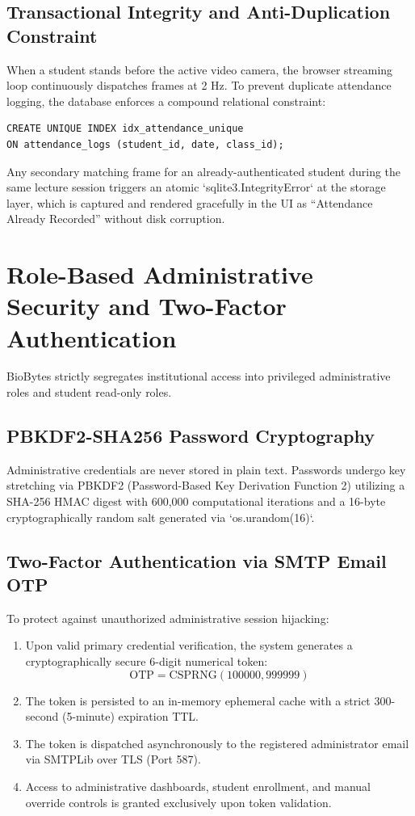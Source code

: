 \subsection{Transactional Integrity and Anti-Duplication Constraint}
When a student stands before the active video camera, the browser streaming loop continuously dispatches frames at 2 Hz. To prevent duplicate attendance logging, the database enforces a compound relational constraint:
\begin{verbatim}
CREATE UNIQUE INDEX idx_attendance_unique 
ON attendance_logs (student_id, date, class_id);
\end{verbatim}
Any secondary matching frame for an already-authenticated student during the same lecture session triggers an atomic `sqlite3.IntegrityError` at the storage layer, which is captured and rendered gracefully in the UI as ``Attendance Already Recorded'' without disk corruption.

\section{Role-Based Administrative Security and Two-Factor Authentication}
BioBytes strictly segregates institutional access into privileged administrative roles and student read-only roles.

\subsection{PBKDF2-SHA256 Password Cryptography}
Administrative credentials are never stored in plain text. Passwords undergo key stretching via PBKDF2 (Password-Based Key Derivation Function 2) utilizing a SHA-256 HMAC digest with 600,000 computational iterations and a 16-byte cryptographically random salt generated via `os.urandom(16)`.

\subsection{Two-Factor Authentication via SMTP Email OTP}
To protect against unauthorized administrative session hijacking:
\begin{enumerate}
    \item Upon valid primary credential verification, the system generates a cryptographically secure 6-digit numerical token:
    \begin{equation}
    \text{OTP} = \text{CSPRNG}(100000, 999999)
    \end{equation}
    \item The token is persisted to an in-memory ephemeral cache with a strict 300-second (5-minute) expiration TTL.
    \item The token is dispatched asynchronously to the registered administrator email via SMTPLib over TLS (Port 587).
    \item Access to administrative dashboards, student enrollment, and manual override controls is granted exclusively upon token validation.
\end{enumerate}

